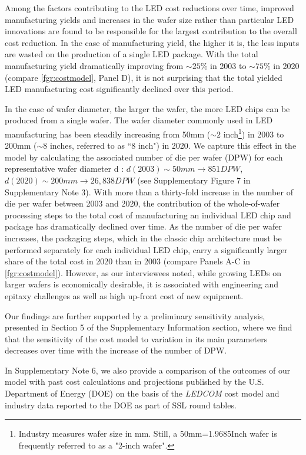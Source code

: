 \documentclass[parskip=full]{article}
\begin{document}
Among the factors contributing to the LED cost reductions over time, improved manufacturing yields and increases in the wafer size rather than particular LED innovations are found to be responsible for the largest contribution to the overall cost reduction. In the case of manufacturing yield, the higher it is, the less inputs are wasted on the production of a single LED package. With the total manufacturing yield dramatically improving from $\sim25\%$ in 2003 to $\sim75\%$ in 2020 (compare \cref{fgr:costmodel}, Panel D), it is not surprising that the total yielded LED manufacturing cost significantly declined over this period.

In the case of wafer diameter, the larger the wafer, the more LED chips can be produced from a single wafer. The wafer diameter commonly used in LED manufacturing has been steadily increasing from 50mm ($\sim2$ inch\footnote{Industry measures wafer size in mm. Still, a 50mm=1.9685Inch wafer is frequently referred to as a "2-inch wafer".}) in 2003 to 200mm ($\sim$8 inches, referred to as “8 inch") in 2020. We capture this effect in the model by calculating the associated number of die per wafer (DPW) for each representative wafer diameter d \cite{de2005investigation}: $d(2003)\sim 50 mm \rightarrow851 DPW$, $d(2020)\sim200 mm \rightarrow 26,838 DPW$ (see Supplementary Figure 7 in Supplementary Note 3). With more than a thirty-fold increase in the number of die per wafer between 2003 and 2020, the contribution of the whole-of-wafer processing steps to the total cost of manufacturing an individual LED chip and package has dramatically declined over time. As the number of die per wafer increases, the packaging steps, which in the classic chip architecture must be performed separately for each individual LED chip, carry a significantly larger share of the total cost in 2020 than in 2003 (compare Panels A-C in \cref{fgr:costmodel}). However, as our interviewees noted, while growing LEDs on larger wafers is economically desirable, it is associated with engineering and epitaxy challenges as well as high up-front cost of new equipment.

Our findings are further supported by a preliminary sensitivity analysis, presented in Section 5 of the Supplementary Information section, where we find that the sensitivity of the cost model to variation in its main parameters decreases over time with the increase of the number of DPW. 

In Supplementary Note 6, we also provide a comparison of the outcomes of our model with past cost calculations and projections published by the U.S. Department of Energy (DOE) on the basis of the \textit{LEDCOM} cost model \cite{ledcomv2} and industry data reported to the DOE as part of SSL round tables.
\end{document}
